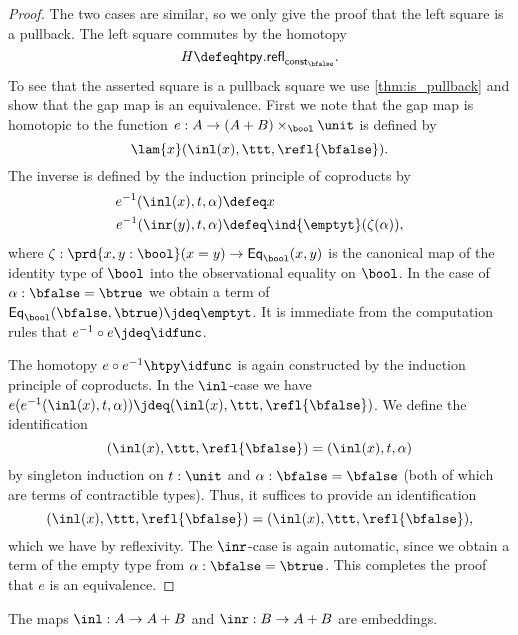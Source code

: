 \begin{proof}
The two cases are similar, so we only give the proof that the left square is a pullback. The left square commutes by the homotopy
\begin{equation*}
H\defeq \mathsf{htpy.refl}_{\mathsf{const}_{\bfalse}}.
\end{equation*}
To see that the asserted square is a pullback square we use \cref{thm:is_pullback} and show that the gap map is an equivalence. First we note that the gap map is homotopic to the function $e:A\to (A+B)\times_\bool\unit$ is defined by
\begin{equation*}
\lam{x}(\inl(x),\ttt,\refl{\bfalse}).
\end{equation*}
The inverse is defined by the induction principle of coproducts by
\begin{align*}
e^{-1}(\inl(x),t,\alpha) & \defeq x \\
e^{-1}(\inr(y),t,\alpha) & \defeq \ind{\emptyt}(\zeta(\alpha)),
\end{align*}
where $\zeta:\prd{x,y:\bool}(x=y)\to \mathsf{Eq}_\bool(x,y)$ is the canonical map of the identity type of $\bool$ into the observational equality on $\bool$. In the case of $\alpha:\bfalse=\btrue$ we obtain a term of $\mathsf{Eq}_\bool(\bfalse,\btrue)\jdeq \emptyt$. It is immediate from the computation rules that $e^{-1}\circ e\jdeq \idfunc$. 

The homotopy $e\circ e^{-1}\htpy \idfunc$ is again constructed by the induction principle of coproducts. In the $\inl$-case we have $e(e^{-1}(\inl(x),t,\alpha))\jdeq (\inl(x),\ttt,\refl{\bfalse})$. We define the identification
\begin{equation*}
(\inl(x),\ttt,\refl{\bfalse})=(\inl(x),t,\alpha)
\end{equation*}
by singleton induction on $t:\unit$ and $\alpha:\bfalse=\bfalse$ (both of which are terms of contractible types). Thus, it suffices to provide an identification
\begin{equation*}
(\inl(x),\ttt,\refl{\bfalse})=(\inl(x),\ttt,\refl{\bfalse}),
\end{equation*}
which we have by reflexivity. The $\inr$-case is again automatic, since we obtain a term of the empty type from $\alpha:\bfalse=\btrue$. This completes the proof that $e$ is an equivalence.
\end{proof}

\begin{cor}\label{cor:inl_emb}
The maps $\inl:A\to A+B$ and $\inr:B\to A+B$ are embeddings.
\end{cor}

